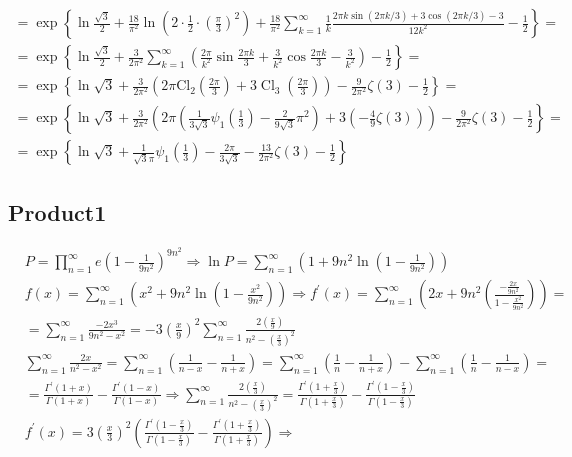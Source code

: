 	$$
	\begin{gathered}
		=\exp \left\{\ln \frac{\sqrt{3}}{2}+\frac{18}{\pi^2} \ln \left(2 \cdot \frac{1}{2} \cdot\left(\frac{\pi}{3}\right)^2\right)+\frac{18}{\pi^2} \sum_{k=1}^{\infty} \frac{1}{k} \frac{2 \pi k \sin (2 \pi k / 3)+3 \cos (2 \pi k / 3)-3}{12 k^2}-\frac{1}{2}\right\}= \\
		=\exp \left\{\ln \frac{\sqrt{3}}{2}+\frac{3}{2 \pi^2} \sum_{k=1}^{\infty}\left(\frac{2 \pi}{k^2} \sin \frac{2 \pi k}{3}+\frac{3}{k^2} \cos \frac{2 \pi k}{3}-\frac{3}{k^2}\right)-\frac{1}{2}\right\}= \\
		=\exp \left\{\ln \sqrt{3}+\frac{3}{2 \pi^2}\left(2 \pi \mathrm{Cl}_2\left(\frac{2 \pi}{3}\right)+3 \operatorname{Cl}_3\left(\frac{2 \pi}{3}\right)\right)-\frac{9}{2 \pi^2} \zeta(3)-\frac{1}{2}\right\}= \\
		=\exp \left\{\ln \sqrt{3}+\frac{3}{2 \pi^2}\left(2 \pi\left(\frac{1}{3 \sqrt{3}} \psi_1\left(\frac{1}{3}\right)-\frac{2}{9 \sqrt{3}} \pi^2\right)+3\left(-\frac{4}{9} \zeta(3)\right)\right)-\frac{9}{2 \pi^2} \zeta(3)-\frac{1}{2}\right\}= \\
		=\exp \left\{\ln \sqrt{3}+\frac{1}{\sqrt{3} \pi} \psi_1\left(\frac{1}{3}\right)-\frac{2 \pi}{3 \sqrt{3}}-\frac{13}{2 \pi^2} \zeta(3)-\frac{1}{2}\right\}
	\end{gathered}
	$$
	
	\subsection{Product1}
	
	$$
	\begin{aligned}
		& P=\prod_{n=1}^{\infty} e\left(1-\frac{1}{9 n^2}\right)^{9 n^2} \Rightarrow \ln P=\sum_{n=1}^{\infty}\left(1+9 n^2 \ln \left(1-\frac{1}{9 n^2}\right)\right) \\
		& f(x)=\sum_{n=1}^{\infty}\left(x^2+9 n^2 \ln \left(1-\frac{x^2}{9 n^2}\right)\right) \Rightarrow f^{\prime}(x)=\sum_{n=1}^{\infty}\left(2 x+9 n^2\left(\frac{-\frac{2 x}{9 n^2}}{1-\frac{x^2}{9 n^2}}\right)\right)= \\
		& =\sum_{n=1}^{\infty} \frac{-2 x^3}{9 n^2-x^2}=-3\left(\frac{x}{9}\right)^2 \sum_{n=1}^{\infty} \frac{2\left(\frac{x}{9}\right)}{n^2-\left(\frac{x}{3}\right)^2} \\
		& \sum_{n=1}^{\infty} \frac{2 x}{n^2-x^2}=\sum_{n=1}^{\infty}\left(\frac{1}{n-x}-\frac{1}{n+x}\right)=\sum_{n=1}^{\infty}\left(\frac{1}{n}-\frac{1}{n+x}\right)-\sum_{n=1}^{\infty}\left(\frac{1}{n}-\frac{1}{n-x}\right)= \\
		& =\frac{\Gamma^{\prime}(1+x)}{\Gamma(1+x)}-\frac{\Gamma^{\prime}(1-x)}{\Gamma(1-x)} \Rightarrow \sum_{n=1}^{\infty} \frac{2\left(\frac{x}{3}\right)}{n^2-\left(\frac{x}{3}\right)^2}=\frac{\Gamma^{\prime}\left(1+\frac{x}{3}\right)}{\Gamma\left(1+\frac{x}{3}\right)}-\frac{\Gamma^{\prime}\left(1-\frac{x}{3}\right)}{\Gamma\left(1-\frac{x}{3}\right)} \\
		& f^{\prime}(x)=3\left(\frac{x}{3}\right)^2\left(\frac{\Gamma^{\prime}\left(1-\frac{x}{3}\right)}{\Gamma\left(1-\frac{x}{3}\right)}-\frac{\Gamma^{\prime}\left(1+\frac{x}{3}\right)}{\Gamma\left(1+\frac{x}{3}\right)}\right) \Rightarrow \\
		&
	\end{aligned}
	$$
	
